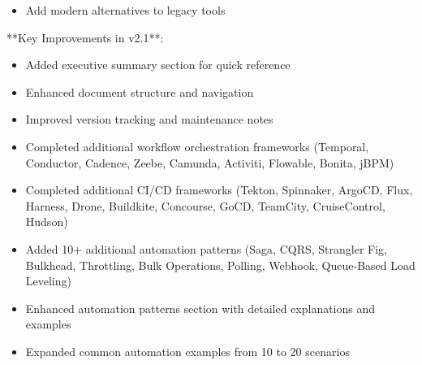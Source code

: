 \documentclass[11pt,a4paper]{article}
\begin{document}
\begin{itemize}
\item Add modern alternatives to legacy tools
\end{itemize}

**Key Improvements in v2.1**:

\begin{itemize}
\item Added executive summary section for quick reference
\end{itemize}

\begin{itemize}
\item Enhanced document structure and navigation
\end{itemize}

\begin{itemize}
\item Improved version tracking and maintenance notes
\end{itemize}

\begin{itemize}
\item Completed additional workflow orchestration frameworks (Temporal, Conductor, Cadence, Zeebe, Camunda, Activiti, Flowable, Bonita, jBPM)
\end{itemize}

\begin{itemize}
\item Completed additional CI/CD frameworks (Tekton, Spinnaker, ArgoCD, Flux, Harness, Drone, Buildkite, Concourse, GoCD, TeamCity, CruiseControl, Hudson)
\end{itemize}

\begin{itemize}
\item Added 10+ additional automation patterns (Saga, CQRS, Strangler Fig, Bulkhead, Throttling, Bulk Operations, Polling, Webhook, Queue-Based Load Leveling)
\end{itemize}

\begin{itemize}
\item Enhanced automation patterns section with detailed explanations and examples
\end{itemize}

\begin{itemize}
\item Expanded common automation examples from 10 to 20 scenarios
\end{itemize}
\end{document}
